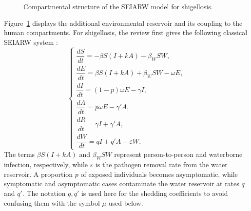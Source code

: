\documentclass[00-main.tex]{subfiles}
\begin{document}
\begin{figure}[htbp]
\centering
{}
\caption{Compartmental structure of the SEIARW model for shigellosis.}
\label{fig:shigellosis-seiarw}
\end{figure}

Figure~\ref{fig:shigellosis-seiarw} displays the additional environmental reservoir and its coupling to the human compartments. For shigellosis, the review first gives the following classical SEIARW system \cite{Ch21}:
\[
\begin{cases}
 \dfrac{dS}{dt}=-\beta S(I+kA)-\beta_WSW,\\[8pt]
 \dfrac{dE}{dt}=\beta S(I+kA)+\beta_WSW-\omega E,\\[8pt]
 \dfrac{dI}{dt}=(1-p)\omega E-\gamma I,\\[8pt]
 \dfrac{dA}{dt}=p\omega E-\gamma' A,\\[8pt]
 \dfrac{dR}{dt}=\gamma I+\gamma' A,\\[8pt]
 \dfrac{dW}{dt}=qI+q'A-\varepsilon W.
\end{cases}
\]
The terms $\beta S(I+kA)$ and $\beta_WSW$ represent person-to-person and waterborne infection, respectively, while $\varepsilon$ is the pathogen removal rate from the water reservoir.
A proportion $p$ of exposed individuals becomes asymptomatic, while symptomatic and asymptomatic cases contaminate the water reservoir at rates $q$ and $q'$.
The notation $q,q'$ is used here for the shedding coefficients to avoid confusing them with the symbol $\mu$ used below.
\end{document}
